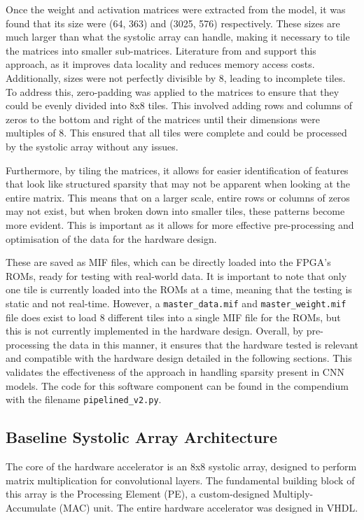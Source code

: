 \documentclass[12pt, a4paper, ukenglish]{article}
\begin{document}
        Once the weight and activation matrices were extracted from the model, it was found that its size were (64, 363) and (3025, 576) respectively. These sizes are much larger than what the systolic array can handle, making it necessary to tile the matrices into smaller sub-matrices. Literature from \textcite{palacios_systolic_2025} and \textcite{parashar_scnn_2017} support this approach, as it improves data locality and reduces memory access costs. Additionally, sizes were not perfectly divisible by 8, leading to incomplete tiles. To address this, zero-padding was applied to the matrices to ensure that they could be evenly divided into 8x8 tiles. This involved adding rows and columns of zeros to the bottom and right of the matrices until their dimensions were multiples of 8. This ensured that all tiles were complete and could be processed by the systolic array without any issues.
        
        Furthermore, by tiling the matrices, it allows for easier identification of features that look like structured sparsity that may not be apparent when looking at the entire matrix. This means that on a larger scale, entire rows or columns of zeros may not exist, but when broken down into smaller tiles, these patterns become more evident. This is important as it allows for more effective pre-processing and optimisation of the data for the hardware design.

        These are saved as MIF files, which can be directly loaded into the FPGA's ROMs, ready for testing with real-world data. It is important to note that only one tile is currently loaded into the ROMs at a time, meaning that the testing is static and not real-time. However, a \texttt{master\_data.mif} and \texttt{master\_weight.mif} file does exist to load 8 different tiles into a single MIF file for the ROMs, but this is not currently implemented in the hardware design.
        Overall, by pre-processing the data in this manner, it ensures that the hardware tested is relevant and compatible with the hardware design detailed in the following sections. This validates the effectiveness of the approach in handling sparsity present in CNN models. The code for this software component can be found in the compendium with the filename \texttt{pipelined\_v2.py}.
        
    \subsection{Baseline Systolic Array Architecture} \label{sec: baseline}
    The core of the hardware accelerator is an 8x8 systolic array, designed to perform matrix multiplication for convolutional layers. The fundamental building block of this array is the Processing Element (PE), a custom-designed Multiply-Accumulate (MAC) unit. The entire hardware accelerator was designed in VHDL.
    
\end{document}
